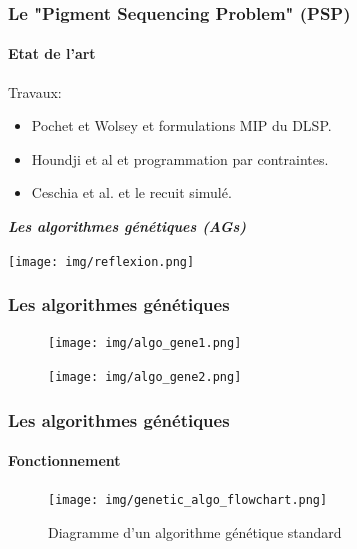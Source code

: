 \documentclass[11pt]{beamer}
\begin{document}
 \begin{frame}
 \frametitle{Le "Pigment Sequencing Problem" (PSP)}
 \framesubtitle{Etat de l'art} 
 
 	Travaux:
    \begin{itemize}
    	\item Pochet et Wolsey et formulations MIP du DLSP.
    	\vspace*{.5cm}
    	\item Houndji et al et programmation par contraintes.
    	\vspace*{.5cm}
    	\item Ceschia et al. et le recuit simulé.
    \end{itemize}
 \end{frame} 
 
 \begin{frame}
 	\begin{minipage}[c]{.46\linewidth}
      \Large{\emph{\textbf{Les algorithmes génétiques (AGs)}}}
   \end{minipage} \hfill
   \begin{minipage}[c]{.46\linewidth}
		\texttt{[image: img/reflexion.png]}
   \end{minipage}
\end{frame}  


\begin{frame}
\frametitle{Les algorithmes génétiques}
\begin{figure}
   \begin{minipage}[c]{.46\linewidth}
      \texttt{[image: img/algo\_gene1.png]}
   \end{minipage} \hfill
   \begin{minipage}[c]{.46\linewidth}
      \texttt{[image: img/algo\_gene2.png]}
   \end{minipage}
 \end{figure}
\end{frame} 

\begin{frame}
\frametitle{Les algorithmes génétiques}
\framesubtitle{Fonctionnement}
\begin{figure}
      \texttt{[image: img/genetic\_algo\_flowchart.png]}
      \caption{Diagramme d'un algorithme génétique standard}
	  \label{fig:genetic_algo_flowchart}
 \end{figure}
\end{frame} 
\end{document}
